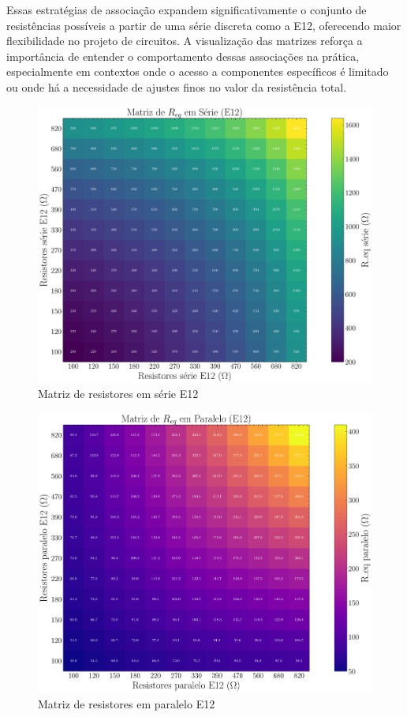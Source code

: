 \documentclass[conference]{IEEEtran}
\begin{document}
Essas estratégias de associação expandem significativamente o conjunto de resistências possíveis a partir de uma série discreta como a E12, oferecendo maior flexibilidade no projeto de circuitos. A visualização das matrizes reforça a importância de entender o comportamento dessas associações na prática, especialmente em contextos onde o acesso a componentes específicos é limitado ou onde há a necessidade de ajustes finos no valor da resistência total.

\begin{figure}[htbp]
    \centering
    \caption{Matriz de resistores em série E12}
    \label{fig:matriz_serie_e12}
    \includegraphics[width=0.8\linewidth]{figures/matriz_serie_e12.pdf}
\end{figure}

\begin{figure}[htbp]
    \centering
    \caption{Matriz de resistores em paralelo E12}
    \label{fig:matriz_paralelo_e12}
    \includegraphics[width=0.8\linewidth]{figures/matriz_paralelo_e12.pdf}
\end{figure}
\end{document}
